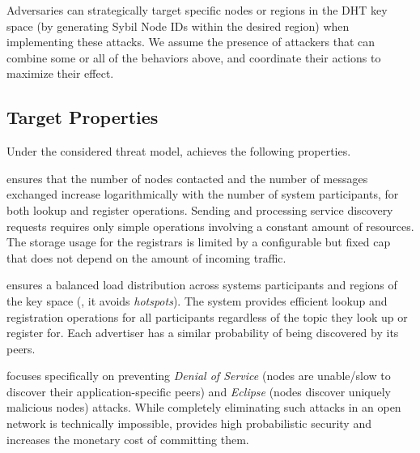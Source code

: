 Adversaries can strategically target specific nodes or regions in the DHT key space (\ie by generating Sybil Node IDs within the desired region) when implementing these attacks.
We assume the presence of attackers that can combine some or all of the behaviors above, and coordinate their actions to maximize their effect. 

\subsection{Target Properties}

Under the considered threat model, \sysname achieves the following properties.

\sysname ensures that the number of nodes contacted and the number of messages exchanged increase logarithmically with the number of system participants, for both lookup and register operations. 
Sending and processing service discovery requests requires only simple operations involving a constant amount of resources.
The storage usage for the registrars is limited by a configurable but fixed cap that does not depend on the amount of incoming traffic. 

\sysname ensures a balanced load distribution across systems participants and regions of the key space (\ie, it avoids \emph{hotspots}).
The system provides efficient lookup and registration operations for all participants regardless of the topic they look up or register for.
Each advertiser has a similar probability of being discovered by its peers. 

\sysname focuses specifically on preventing \emph{Denial of Service} (nodes are unable/slow to discover their application-specific peers) and \emph{Eclipse} (nodes discover uniquely malicious nodes) attacks.
While completely eliminating such attacks in an open network is technically impossible, \sysname provides high probabilistic security 
and increases the monetary cost of committing them. 

